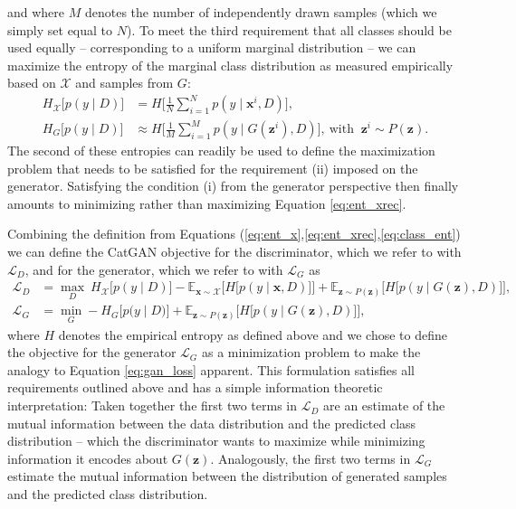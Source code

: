 \documentclass{article} \usepackage{iclr2016_conference,times}
\newcommand{\bx}{\mathbf{x}}
\newcommand{\bz}{\mathbf{z}}
\begin{document}
and where $M$ denotes the number of independently drawn samples (which
we simply set equal to $N$).
To meet the third requirement that all classes should be used equally --
corresponding to a uniform marginal distribution -- we can
maximize the entropy of the marginal class distribution as measured
empirically based on $\mathcal{X}$ and samples from $G$:
\begin{equation}
\begin{aligned}
  H_\mathcal{X} \Big [ p(y \mid D) \Big] &=
  H \Big [ \frac{1}{N} \sum^N_{i=1} p(y \mid \bx^i, D) \Big ], \\
  H_{G} \Big [ p(y \mid D) \Big] &\approx
  H \Big [ \frac{1}{M} \sum^M_{i=1} p(y \mid G(\bz^i), D) \Big ], \
  \text{with } \ \bz^i \sim P(\bz).
\label{eq:class_ent}
\end{aligned}
\end{equation}
The second of these entropies can readily be used to define the
maximization problem that needs to be satisfied for the requirement (ii)
imposed on the generator. Satisfying the condition (i) from
the generator perspective then finally amounts to minimizing rather
than maximizing Equation \eqref{eq:ent_xrec}.

Combining the definition from Equations
(\ref{eq:ent_x},\ref{eq:ent_xrec},\ref{eq:class_ent}) we can
define the CatGAN objective for the discriminator, which we refer to
with $\mathcal{L}_{D}$, and for the generator, which we refer to with
$\mathcal{L}_{G}$ as
\begin{equation}
\begin{aligned}
  \mathcal{L}_{D} &= \max_{D} \ H_{\mathcal{X}} \Big [ p( y \mid D ) \Big ] -  \mathbb{E}_{\bx \sim
                                \mathcal{X}} \Big[ H \big[ p(y
                                 \mid \bx, D) \big]  \Big] + \mathbb{E}_{\bz
    \sim P(\bz)} \Big[ H\big[ p(y \mid G(\bz), D) \big]  \Big],
 \\
  \mathcal{L}_{G} &= \min_{G} - H_{G} \Big [ p\big( y \mid D \big) \Big ] + 
  \mathbb{E}_{\bz \sim P(\bz)} \Big[ H \big[ p(y \mid G(\bz), D) \big] \Big],
\label{eq:objective_catgan}
\end{aligned}
\end{equation}
where $H$ denotes the empirical entropy as defined above and we chose
to define the objective for the generator $\mathcal{L}_{G}$ as a
minimization problem to make the analogy to Equation
\eqref{eq:gan_loss} apparent. This formulation satisfies all
requirements outlined above and has a simple information theoretic
interpretation: Taken together the first two terms in
$\mathcal{L}_{D}$ are an estimate of the mutual information between
the data distribution and the predicted class distribution -- which
the discriminator wants to maximize while minimizing information it
encodes about $G(\bz)$. Analogously, the first two terms in
$\mathcal{L}_{G}$ estimate the mutual information between the
distribution of generated samples and the predicted class
distribution.
\end{document}
